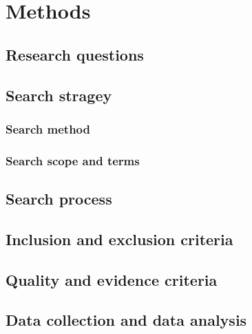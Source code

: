 \chapter{Methods\label{methods}}
\section{Research questions}
\section{Search stragey}
\subsection{Search method}
\subsection{Search scope and terms}
\section{Search process}
\section{Inclusion and exclusion criteria}
\section{Quality and evidence criteria}
\section{Data collection and data analysis}
